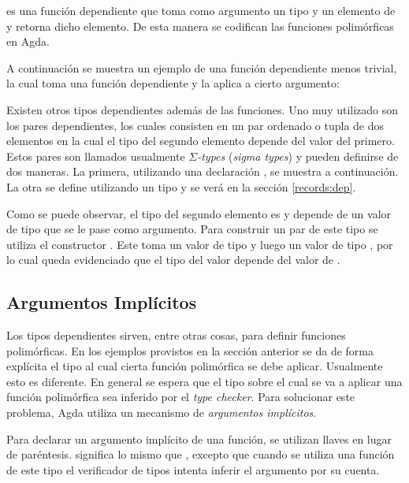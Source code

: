 
 es una función dependiente que toma como argumento un tipo  y un elemento de  y retorna dicho elemento. De esta manera se codifican las funciones polimórficas en Agda. 

A continuación se muestra un ejemplo de una función dependiente menos trivial, la cual toma una función dependiente y la aplica a cierto argumento:


Existen otros tipos dependientes además de las funciones. Uno muy utilizado son los pares dependientes, los cuales consisten en un par ordenado o tupla de dos elementos en la cual el tipo del segundo elemento depende del valor del primero. Estos pares son llamados usualmente \textit{$\Sigma$-types} (\textit{sigma types}) y pueden definirse de dos maneras. La primera, utilizando una declaración , se muestra a continuación. La otra se define utilizando un tipo  y se verá en la sección \ref{records:dep}.


Como se puede observar, el tipo del segundo elemento es  y depende de un valor de tipo  que se le pase como argumento. Para construir un par de este tipo se utiliza el constructor \AgdaInductiveConstructor{$\_$,$\_$}. Este toma un valor  de tipo  y luego un valor  de tipo , por lo cual queda evidenciado que el tipo del valor  depende del valor de .

\subsection{Argumentos Implícitos}\label{dependent:implicit}

Los tipos dependientes sirven, entre otras cosas, para definir funciones polimórficas. En los ejemplos provistos en la sección anterior se da de forma explícita el tipo al cual cierta función polimórfica se debe aplicar. Usualmente esto es diferente. En general se espera que el tipo sobre el cual se va a aplicar una función polimórfica sea inferido por el \textit{type checker}. Para solucionar este problema, Agda utiliza un mecanismo de \textit{argumentos implícitos}. 

Para declarar un argumento implícito de una función, se utilizan llaves en lugar de paréntesis. \AgdaSymbol{\{} \AgdaSymbol{:} \AgdaSymbol{\}} \AgdaSymbol{$\rightarrow$}  significa lo mismo que \AgdaSymbol{(} \AgdaSymbol{:} \AgdaSymbol{)} \AgdaSymbol{$\rightarrow$} , excepto que cuando se utiliza una función de este tipo el verificador de tipos intenta inferir el argumento por su cuenta. 


